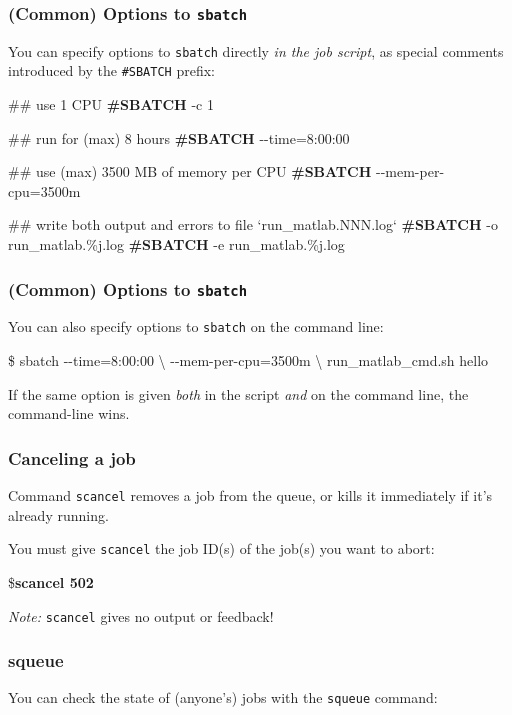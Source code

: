 \documentclass[english,serif,mathserif,usenames,dvipsnames]{beamer}
\begin{document}
\begin{frame}[fragile]
  \frametitle{(Common) Options to \texttt{sbatch}}

  You can specify options to \texttt{sbatch} directly \emph{in the job
    script}, as special comments introduced by the \texttt{\#SBATCH}
  prefix:

  \begin{semiverbatim}\footnotesize\ttfamily
 ## use 1 CPU
{\bfseries #SBATCH} -c 1

 ## run for (max) 8 hours
{\bfseries #SBATCH} -{}-time=8:00:00

 ## use (max) 3500 MB of memory per CPU
{\bfseries #SBATCH} -{}-mem-per-cpu=3500m

 ## write both output and errors to file `run_matlab.NNN.log`
{\bfseries #SBATCH} -o run_matlab.\%j.log
{\bfseries #SBATCH} -e run_matlab.\%j.log
  \end{semiverbatim}
\end{frame}


\begin{frame}[fragile]
  \frametitle{(Common) Options to \texttt{sbatch}}

  You can also specify options to \texttt{sbatch} on the
  command line:

  \begin{semiverbatim}
\$ sbatch -{}-time=8:00:00 \textbackslash
          -{}-mem-per-cpu=3500m \textbackslash
          run_matlab_cmd.sh hello
\end{semiverbatim}

  \+ If the same option is given \emph{both} in the script \emph{and}
  on the command line, the command-line wins.
\end{frame}


\begin{frame}[fragile]
  \frametitle{Canceling a job}

  Command \texttt{scancel} removes a job from the queue, or kills it
  immediately if it's already running.

  \+
  You must give \texttt{scancel} the job ID(s) of the job(s) you
  want to abort:

\begin{semiverbatim}
\${\bfseries scancel 502}
\end{semiverbatim}

  \+
  \emph{Note:} \texttt{scancel} gives no output or feedback!
\end{frame}


\begin{frame}[fragile]
  \frametitle{squeue}
  You can check the state of (anyone's) jobs with the \texttt{squeue}
  command:


\end{frame}
\end{document}
